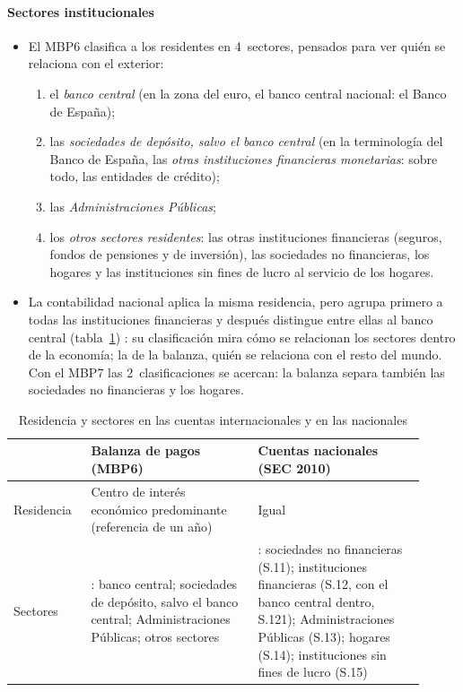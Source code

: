 \documentclass[11pt]{article}
\begin{document}
\paragraph{Sectores institucionales}
\begin{itemize}
\item El MBP6 clasifica a los residentes en 4~sectores, pensados para ver quién se relaciona con el exterior\nocite{FMI2009MBP6}:
  \begin{enumerate}
  \item el \emph{banco central} (en la zona del euro, el banco central nacional: el Banco de España);
  \item las \emph{sociedades de depósito, salvo el banco central} (en la terminología del Banco de España, las \emph{otras instituciones financieras monetarias}: sobre todo, las entidades de crédito);
  \item las \emph{Administraciones Públicas};
  \item los \emph{otros sectores residentes}: las otras instituciones financieras (seguros, fondos de pensiones y de inversión), las sociedades no financieras, los hogares y las instituciones sin fines de lucro al servicio de los hogares.
  \end{enumerate}
\item La contabilidad nacional aplica la misma residencia, pero agrupa primero a todas las instituciones financieras y después distingue entre ellas al banco central (tabla~\ref{tab:sectores-sec2010}) : su clasificación mira cómo se relacionan los sectores dentro de la economía; la de la balanza, quién se relaciona con el resto del mundo. Con el MBP7 las 2~clasificaciones se acercan: la balanza separa también las sociedades no financieras y los hogares.
\end{itemize}

\begin{table}[H]
\centering
\caption{Residencia y sectores en las cuentas internacionales y en las nacionales}\label{tab:sectores-sec2010}
\renewcommand{\arraystretch}{1.25}
\small
\begin{tabular}{>{\raggedright\arraybackslash}m{0.17\linewidth}>{\raggedright\arraybackslash}m{0.37\linewidth}>{\raggedright\arraybackslash}m{0.37\linewidth}}
\toprule
\rowcolor{tceeazulpalido}
 & \textbf{Balanza de pagos (MBP6)} & \textbf{Cuentas nacionales (SEC 2010)}\\
\midrule
Residencia & Centro de interés económico predominante (referencia de un año) & Igual\\
Sectores & 4: banco central; sociedades de depósito, salvo el banco central; Administraciones Públicas; otros sectores & 5: sociedades no financieras (S.11); instituciones financieras (S.12, con el banco central dentro, S.121); Administraciones Públicas (S.13); hogares (S.14); instituciones sin fines de lucro (S.15)\\
\bottomrule
\end{tabular}
\end{table}
\end{document}
